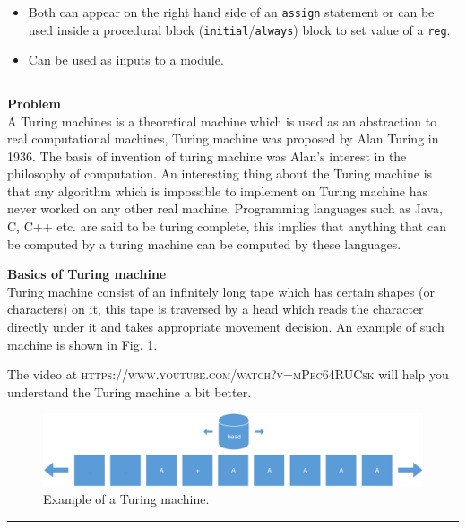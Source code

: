 \documentclass[a4paper,10pt]{article}
\theoremstyle{mytheor}
\newcounter{problemNumber}
\newcommand {
  \insertProblem}[1]{
  \vspace{0.5cm}
  \hrule
  \vspace{0.3cm}

  {\color{greatblue}\textbf{\large{Problem \theproblemNumber}}}
  \vspace{2pt}\\#1

  \addtocounter{problemNumber}{1}
  \vspace{0.2cm}
  \hrule  
  \vspace{0.5cm}
}
\begin{document}
 \begin{itemize}
 \item Both can appear on the right hand side of an \lstinline[style=verilog-inline-style]{assign} statement or can be used inside a procedural block (\lstinline[style=verilog-inline-style]{initial}/\lstinline[style=verilog-inline-style]{always}) block to set value of a \lstinline[style=verilog-inline-style]{reg}.
 \item Can be used as inputs to a module.
\end{itemize}


 \insertProblem { A Turing machines is a theoretical machine which is
   used as an abstraction to real computational machines, Turing
   machine was proposed by Alan Turing in 1936. The basis of invention
   of turing machine was Alan's interest in the philosophy of
   computation. An interesting thing about the Turing machine is that
   any algorithm which is impossible to implement on Turing machine
   has never worked on any other real machine. Programming languages
   such as Java, C, C++ etc. are said to be turing complete, this
   implies that anything that can be computed by a turing machine can
   be computed by these languages.

   \textbf{Basics of Turing machine}\\ Turing machine consist of an
   infinitely long tape which has certain shapes (or characters) on
   it, this tape is traversed by a head which reads the character
   directly under it and takes appropriate movement decision. An
   example of such machine is shown in
   Fig. \ref{Fig:turing-machine-example}.

   The video at \textsc{https://www.youtube.com/watch?v=mPec64RUCsk}
   will help you understand the Turing machine a bit better.

  \begin{figure}[!h] \centering  
    \includegraphics[width=\linewidth]{./resources/turingMachine.pdf} 
    \caption{Example of a Turing machine.} 
    \label{Fig:turing-machine-example} 
  \end{figure}

}
\end{document}
